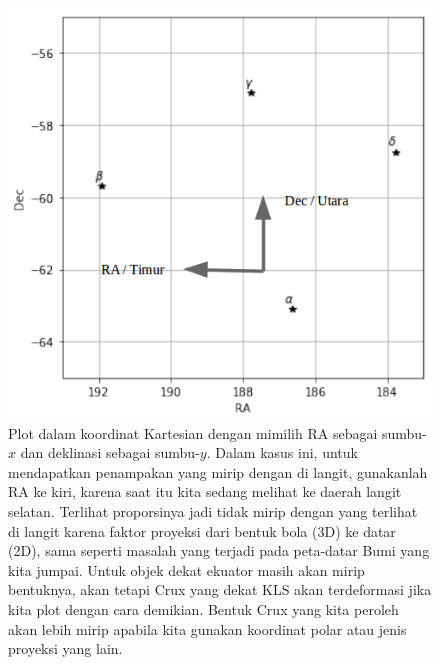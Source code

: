 \documentclass[11pt,fleqn]{exam}
\begin{document}
\begin{questions}
\begin{enumerate}[(a)]
\begin{figure}[H]
\centering
\includegraphics[scale=0.47]{crux_kartesian_RA_ke_kiri.png}
\caption{Plot dalam koordinat Kartesian dengan mimilih RA sebagai sumbu-$x$ dan deklinasi sebagai sumbu-$y$. Dalam kasus ini, untuk mendapatkan penampakan yang mirip dengan di langit, gunakanlah RA ke kiri, karena saat itu kita sedang melihat ke daerah langit selatan. Terlihat proporsinya jadi tidak mirip dengan yang terlihat di langit karena faktor proyeksi dari bentuk bola (3D) ke datar (2D), sama seperti masalah yang terjadi pada peta-datar Bumi yang kita jumpai. Untuk objek dekat ekuator masih akan mirip bentuknya, akan tetapi Crux yang dekat KLS akan terdeformasi jika kita plot dengan cara demikian. Bentuk Crux yang kita peroleh akan lebih mirip apabila kita gunakan koordinat polar atau jenis proyeksi yang lain.}
\label{fig:plotkartesian}
\end{figure}


\end{enumerate}
\end{questions}
\end{document}

